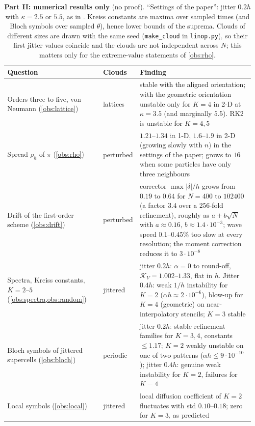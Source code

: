 \documentclass[11pt,a4paper]{article}
\theoremstyle{plain}
\theoremstyle{definition}
\theoremstyle{remark}
\numberwithin{equation}{section}
\begin{document}
\begin{table}[p]
\centering
\caption{\textbf{Part II: numerical results only} (no proof). ``Settings of the paper'': jitter $0.2h$ with $\kappa=2.5$ or $5.5$, as in \cite{JungMUSCL2026}. Kreiss constants are maxima over sampled times (and Bloch symbols over sampled $\theta$), hence lower bounds of the suprema. Clouds of different sizes are drawn with the same seed (\texttt{make\_cloud} in \texttt{linop.py}), so their first jitter values coincide and the clouds are not independent across $N$; this matters only for the extreme-value statements of \cref{obs:rho}.}\label{tab:measured}
\footnotesize\setlength{\tabcolsep}{4pt}
\begin{tabular}{>{\raggedright}p{4.4cm}>{\raggedright}p{2.6cm}>{\raggedright\arraybackslash}p{8.2cm}}
\toprule
Question & Clouds & Finding\\
\midrule
Orders three to five, von Neumann (\cref{obs:lattice}) & lattices & stable with the aligned orientation; with the geometric orientation unstable only for $K=4$ in 2-D at $\kappa=3.5$ (and marginally $5.5$). RK2 is unstable for $K=4,5$\\
Spread $\rho_h$ of $\pi$ (\cref{obs:rho}) & perturbed & $1.21$--$1.34$ in 1-D, $1.6$--$1.9$ in 2-D (growing slowly with $n$) in the settings of the paper; grows to $16$ when some particles have only three neighbours\\
Drift of the first-order scheme (\cref{obs:drift}) & perturbed & corrector $\max|\delta|/h$ grows from $0.19$ to $0.64$ for $N=400$ to $102400$ (a factor $3.4$ over a $256$-fold refinement), roughly as $a+b\sqrt N$ with $a\approx0.16$, $b\approx1.4\cdot10^{-3}$; wave speed $0.1$--$0.45\%$ too slow at every resolution; the moment correction reduces it to $3\cdot10^{-8}$\\
Spectra, Kreiss constants, $K=2$--$5$ (\cref{obs:spectra,obs:random}) & jittered & jitter $0.2h$: $\alpha=0$ to round-off, $\mathcal K_V=1.002$--$1.33$, flat in $h$. Jitter $0.4h$: weak $1/h$ instability for $K=2$ ($\alpha h\approx2\cdot10^{-6}$), blow-up for $K=4$ (geometric) on near-interpolatory stencils; $K=3$ stable\\
Bloch symbols of jittered supercells (\cref{obs:bloch}) & periodic & jitter $0.2h$: stable refinement families for $K=3,4$, constants $\le1.17$; $K=2$ weakly unstable on one of two patterns ($\alpha h\le9\cdot10^{-10}$); jitter $0.4h$: genuine weak instability for $K=2$, failures for $K=4$\\
Local symbols (\cref{obs:local}) & jittered & local diffusion coefficient of $K=2$ fluctuates with std $0.10$--$0.18$; zero for $K=3$, as predicted\\

\end{tabular}
\end{table}
\end{document}
